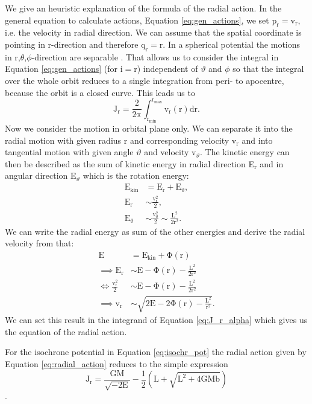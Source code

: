 \par We give an heuristic explanation of the formula of the radial action. In the general equation to calculate actions, Equation \eqref{eq:gen_actions}, we set $\mathrm{p_r} = \mathrm{v_r} $, i.e. the velocity in radial direction. We can assume that the spatial coordinate is pointing in r-direction and therefore \(\mathrm{q_r=r}\). In a spherical potential the motions in r,\(\theta\),\(\phi\)-direction are separable \citep[sec. 3.5.2]{2008gady.book.....B}. That allows us to consider the integral in Equation \eqref{eq:gen_actions} (for i$=$r) independent of $\vartheta$ and $\phi$ so that the integral over the whole orbit reduces to a single integration from peri- to apocentre, because the orbit is a closed curve. This leads us to 
\begin{equation}\label{eq:J_r_alpha}
\mathrm{J_r=\frac{2}{2\pi}\int_{r_{min}}^{r_{max}}v_r(r)dr}.
\end{equation}
Now we consider the motion in orbital plane only. We can separate it into the radial motion with given radius r and corresponding velocity v\(_\mathrm{r}\) and into tangential motion with given angle \(\vartheta\) and velocity v\(_\vartheta\). The kinetic energy can then be described as the sum of kinetic energy in radial direction E\(_\mathrm{r}\) and in angular direction E\(_\vartheta\) which is the rotation energy: 
\begin{align}
\mathrm{E_{kin} }&=\mathrm{E_r+E_\vartheta},\\\mathrm{E_r} & \sim \mathrm{ \frac{v_r^2}{2} },\\\mathrm{ E_\vartheta} & \sim \mathrm{ \frac{v_\vartheta^2}{2}\sim \frac{L^2}{2r^2}}. 
\end{align}
We can write the radial energy as sum of the other energies and derive the radial velocity from that:
\begin{align*}
\mathrm{E}& = \mathrm{ E_{kin}+\Phi(r)}\\
\implies \mathrm{E_r} & \sim \mathrm{ E- \Phi(r)-\frac{L^2}{2r^2}}\\
\Leftrightarrow \mathrm{\frac{v_r^2}{2} } & \sim \mathrm{ E-\Phi(r)-\frac{L^2}{2r^2}}\\
\implies \mathrm{v_r} & \sim \mathrm{ \sqrt{2E-2\Phi(r)-\frac{L^2}{r^2}}}.
\end{align*}
We can set this result in the integrand of Equation \eqref{eq:J_r_alpha} which gives us the equation of the radial action. 
\par For the isochrone potential in Equation \eqref{eq:isochr_pot} the radial action given by Equation \eqref{eq:radial_action} reduces to the simple expression 
\begin{equation}\label{eq:isochrone_radial_action}
\mathrm{J_r=\frac{GM}{\sqrt{-2E}} -\frac{1}{2} \left(L+\sqrt{L^2+4GMb}\right)}
\end{equation}
\citep[p.221, eq. 3.225]{2008gady.book.....B}.
